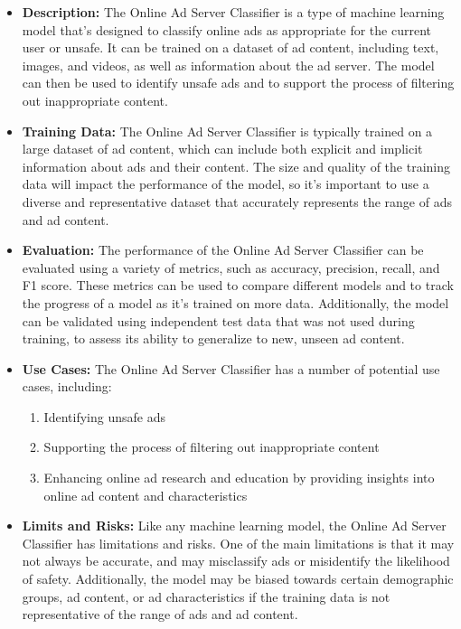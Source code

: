\begin{itemize}
    \item \textbf{Description:} The Online Ad Server Classifier is a type of machine learning model that's designed to classify online ads as appropriate for the current user or unsafe. It can be trained on a dataset of ad content, including text, images, and videos, as well as information about the ad server. The model can then be used to identify unsafe ads and to support the process of filtering out inappropriate content.
    \item \textbf{Training Data:} The Online Ad Server Classifier is typically trained on a large dataset of ad content, which can include both explicit and implicit information about ads and their content. The size and quality of the training data will impact the performance of the model, so it's important to use a diverse and representative dataset that accurately represents the range of ads and ad content.
    \item \textbf{Evaluation:} The performance of the Online Ad Server Classifier can be evaluated using a variety of metrics, such as accuracy, precision, recall, and F1 score. These metrics can be used to compare different models and to track the progress of a model as it's trained on more data. Additionally, the model can be validated using independent test data that was not used during training, to assess its ability to generalize to new, unseen ad content.
    \item \textbf{Use Cases:} The Online Ad Server Classifier has a number of potential use cases, including:
        \begin{enumerate}  
            \item Identifying unsafe ads
            \item Supporting the process of filtering out inappropriate content
            \item Enhancing online ad research and education by providing insights into online ad content and characteristics
        \end{enumerate}
    \item \textbf{Limits and Risks:} Like any machine learning model, the Online Ad Server Classifier has limitations and risks. One of the main limitations is that it may not always be accurate, and may misclassify ads or misidentify the likelihood of safety. Additionally, the model may be biased towards certain demographic groups, ad content, or ad characteristics if the training data is not representative of the range of ads and ad content.

\end{itemize}
